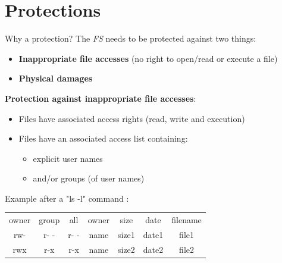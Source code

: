 \documentclass{beamer}[10pt, usepdftitle=false, handout]
\begin{document}
{	\section{Protections}	
	\begin{frame}
	\begin{block}{Why a protection?}
	The \textit{FS} needs to be protected against two things:
	\begin{itemize}
	\item{\textbf{Inappropriate file accesses} (no right to open/read or execute a file)}
	\item{\textbf{Physical damages}}
	\end{itemize}
	\end{block}
	\vspace*{1em}
	\textbf{Protection against inappropriate file accesses}:
	\vspace*{0.5em} 
		\begin{itemize}
		\item{Files have associated access rights (read, write and execution)}
		\item{Files have an associated access list containing: 
		\begin{itemize}
			\item{explicit user names}
			\item{and/or groups (of user names)}
		\end{itemize}
		
		}		
		
		\end{itemize}
		
	\vspace*{1em}
	Example after a "ls -l" command :
	\vspace*{0.5em}
	
	\begin{tabular}{ccccccc}
	owner & group & all & owner & size & date & filename \\
	rw- & r- - & r- - & name & size1 & date1 &  file1 \\
	rwx & r-x & r-x & name & size2 & date2 & file2
	\end{tabular}
	
	\end{frame}	
	
}
\end{document}
